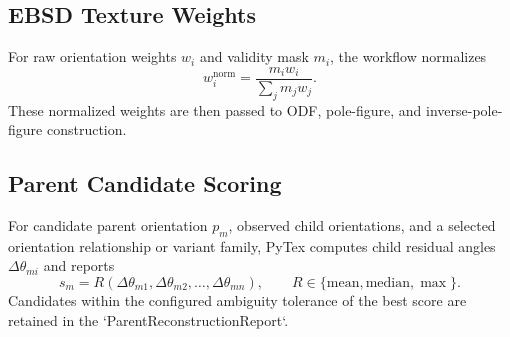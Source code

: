 \subsection{EBSD Texture Weights}

For raw orientation weights $w_i$ and validity mask $m_i$, the workflow normalizes
\[
w_i^{\mathrm{norm}} =
\frac{m_i w_i}{\sum_j m_j w_j}.
\]
These normalized weights are then passed to ODF, pole-figure, and inverse-pole-figure construction.

\subsection{Parent Candidate Scoring}

For candidate parent orientation $p_m$, observed child orientations, and a selected orientation
relationship or variant family, PyTex computes child residual angles $\Delta\theta_{mi}$ and
reports
\[
s_m = R(\Delta\theta_{m1},\Delta\theta_{m2},\ldots,\Delta\theta_{mn}),
\qquad
R \in \{\mathrm{mean},\mathrm{median},\max\}.
\]
Candidates within the configured ambiguity tolerance of the best score are retained in the
`ParentReconstructionReport`.
